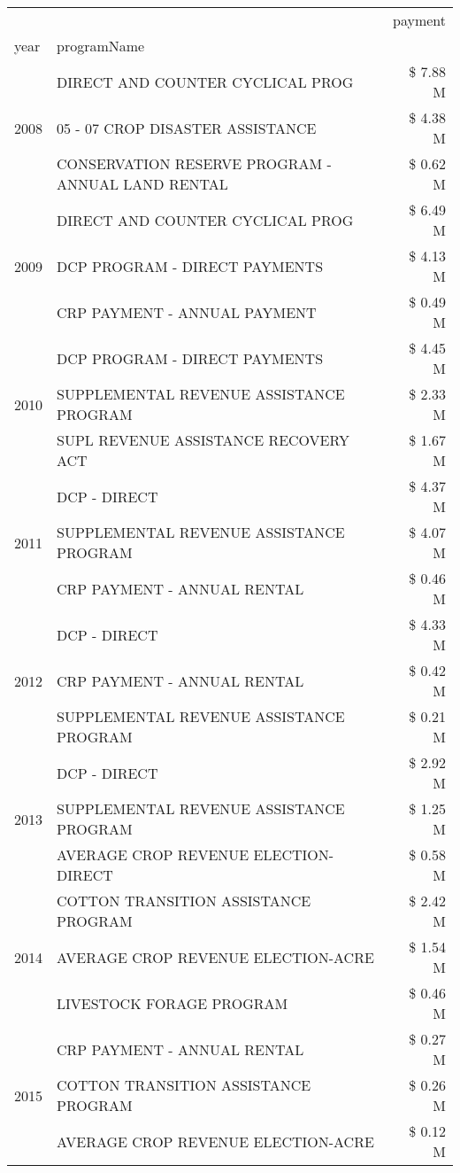 \begin{tabular}{llr}
\toprule
 &  & payment \\
year & programName &  \\
\midrule
\multirow[t]{3}{*}{2008} & DIRECT AND COUNTER CYCLICAL PROG & \$ 7.88 M \\
 & 05 - 07 CROP DISASTER ASSISTANCE & \$ 4.38 M \\
 & CONSERVATION RESERVE PROGRAM - ANNUAL LAND RENTAL & \$ 0.62 M \\
\cline{1-3}
\multirow[t]{3}{*}{2009} & DIRECT AND COUNTER CYCLICAL PROG & \$ 6.49 M \\
 & DCP PROGRAM - DIRECT PAYMENTS & \$ 4.13 M \\
 & CRP PAYMENT - ANNUAL PAYMENT & \$ 0.49 M \\
\cline{1-3}
\multirow[t]{3}{*}{2010} & DCP PROGRAM - DIRECT PAYMENTS & \$ 4.45 M \\
 & SUPPLEMENTAL REVENUE ASSISTANCE PROGRAM & \$ 2.33 M \\
 & SUPL REVENUE ASSISTANCE RECOVERY ACT & \$ 1.67 M \\
\cline{1-3}
\multirow[t]{3}{*}{2011} & DCP - DIRECT & \$ 4.37 M \\
 & SUPPLEMENTAL REVENUE ASSISTANCE PROGRAM & \$ 4.07 M \\
 & CRP PAYMENT - ANNUAL RENTAL & \$ 0.46 M \\
\cline{1-3}
\multirow[t]{3}{*}{2012} & DCP - DIRECT & \$ 4.33 M \\
 & CRP PAYMENT - ANNUAL RENTAL & \$ 0.42 M \\
 & SUPPLEMENTAL REVENUE ASSISTANCE PROGRAM & \$ 0.21 M \\
\cline{1-3}
\multirow[t]{3}{*}{2013} & DCP - DIRECT & \$ 2.92 M \\
 & SUPPLEMENTAL REVENUE ASSISTANCE PROGRAM & \$ 1.25 M \\
 & AVERAGE CROP REVENUE ELECTION-DIRECT & \$ 0.58 M \\
\cline{1-3}
\multirow[t]{3}{*}{2014} & COTTON TRANSITION ASSISTANCE PROGRAM & \$ 2.42 M \\
 & AVERAGE CROP REVENUE ELECTION-ACRE & \$ 1.54 M \\
 & LIVESTOCK FORAGE PROGRAM & \$ 0.46 M \\
\cline{1-3}
\multirow[t]{3}{*}{2015} & CRP PAYMENT - ANNUAL RENTAL & \$ 0.27 M \\
 & COTTON TRANSITION ASSISTANCE PROGRAM & \$ 0.26 M \\
 & AVERAGE CROP REVENUE ELECTION-ACRE & \$ 0.12 M \\

\end{tabular}
